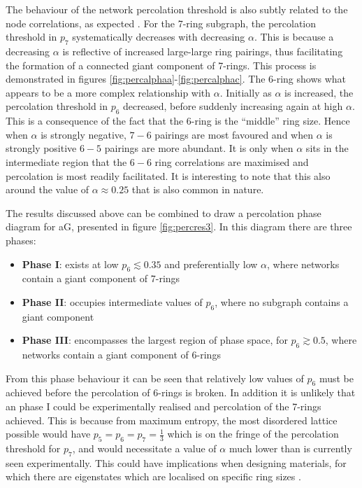 The behaviour of the network percolation threshold is also subtly related to the node correlations, as expected \cite{Zhou2012,Schmeltzer2014}.
For the 7\--ring subgraph, the percolation threshold in $p_7$ systematically decreases with decreasing $\alpha$.
This is because a decreasing $\alpha$ is reflective of increased large\--large ring pairings, thus facilitating the formation of a connected giant component of 7\--rings.
This process is demonstrated in figures \ref{fig:percalphaa}\--\ref{fig:percalphac}.
The 6\--ring shows what appears to be a more complex relationship with $\alpha$.
Initially as $\alpha$ is increased, the percolation threshold in $p_6$ decreased, before suddenly increasing again at high $\alpha$.
This is a consequence of the fact that the 6\--ring is the ``middle'' ring size. 
Hence when $\alpha$ is strongly negative, $7-6$ pairings are most favoured and when $\alpha$ is strongly positive $6-5$ pairings are more abundant.
It is only when $\alpha$ sits in the intermediate region that the $6-6$ ring correlations are maximised and percolation is most readily facilitated.
It is interesting to note that this also around the value of $\alpha\approx 0.25$ that is also common in nature.

The results discussed above can be combined to draw a percolation phase diagram for aG, presented in figure \ref{fig:percres3}.
In this diagram there are three phases:
\begin{itemize}
	\item \textbf{Phase I}: exists at low $p_6\lesssim 0.35$ and preferentially low $\alpha$, where networks contain a giant component of 7\--rings
	\item \textbf{Phase II}: occupies intermediate values of $p_6$, where no subgraph contains a giant component
	\item \textbf{Phase III}: encompasses the largest region of phase space, for $p_6\gtrsim0.5$, where networks contain a giant component of 6\--rings
\end{itemize}
From this phase behaviour it can be seen that relatively low values of $p_6$ must be achieved before the percolation of 6\--rings is broken.
In addition it is unlikely that an phase I could be experimentally realised and percolation of the 7\--rings achieved. 
This is because from maximum entropy, the most disordered lattice possible would have $p_5=p_6=p_7=\frac{1}{3}$ which is on the fringe of the percolation threshold for $p_7$, and would necessitate a value of $\alpha$ much lower than is currently seen experimentally.
This could have implications when designing materials, for which there are eigenstates which are localised on specific ring sizes \cite{Kapko2010,Zhu2016}.




